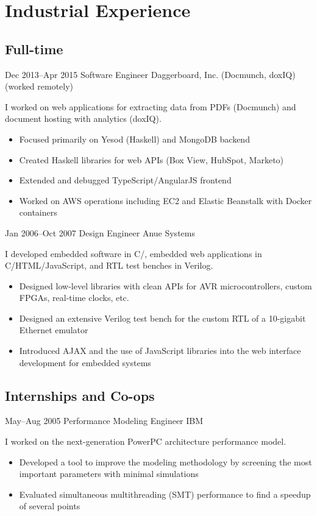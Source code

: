 \documentclass[11pt,a4paper,roman]{moderncv}
\begin{document}
\section{Industrial Experience}


\subsection{Full-time}

\cventry%
{Dec 2013--Apr 2015}%
{Software Engineer}%
{Daggerboard, Inc. (Docmunch, doxIQ)}%
{\sanfrancisco (worked remotely)}%
{}%
{I worked on web applications for extracting data from PDFs (Docmunch) and document hosting with analytics (doxIQ).
\begin{itemize}
\item Focused primarily on Yesod (Haskell) and MongoDB backend
\item Created Haskell libraries for web APIs (Box View, HubSpot, Marketo)
\item Extended and debugged TypeScript/AngularJS frontend
\item Worked on AWS operations including EC2 and Elastic Beanstalk with Docker containers
\end{itemize}}

\cventry%
{Jan 2006--Oct 2007}%
{Design Engineer}%
{Anue Systems}%
{\austin}%
{}%
{I developed embedded software in C/\Cpp, embedded web applications in C/HTML/JavaScript, and RTL test benches in Verilog.
\begin{itemize}
\item Designed low-level libraries with clean APIs for AVR microcontrollers, custom FPGAs, real-time clocks, etc.
\item Designed an extensive Verilog test bench for the custom RTL of a 10-gigabit Ethernet emulator
\item Introduced AJAX and the use of JavaScript libraries into the web interface development for embedded systems
\end{itemize}}


\subsection{Internships and Co-ops}

\cventry%
{May--Aug 2005}%
{Performance Modeling Engineer}%
{IBM}%
{\austin}%
{}%
{I worked on the next-generation PowerPC architecture performance model.
\begin{itemize}
\item Developed a tool to improve the modeling methodology by screening the most important parameters with minimal simulations
\item Evaluated simultaneous multithreading (SMT) performance to find a speedup of several points
\end{itemize}}
\end{document}
